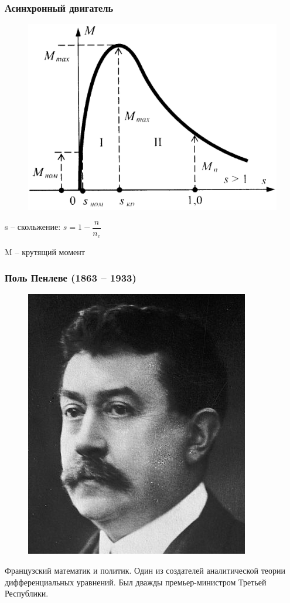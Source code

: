 \documentclass[hyperref={pdftex,unicode}]{beamer}
\begin{document}
\begin{frame}
\frametitle{Асинхронный двигатель}

\begin{figure}[H]
  \center
  \includegraphics[width=0.6\linewidth]{zavisimost-1}
\end{figure}

\vspace{10pt}

\small{s -- скольжение: $ s = 1 - \dfrac{n}{n_c} $}	

\small{M -- крутящий момент}
	

\end{frame}




\begin{frame}
\frametitle{Поль Пенлеве (1863 -- 1933)}

\begin{figure}[H]
  \center
  \includegraphics[width=0.4\linewidth]{penleve}
\end{figure}

\vspace{10pt}
Французский математик и политик. Один из создателей аналитической теории дифференциальных уравнений. Был дважды премьер-министром Третьей Республики.
\end{frame}
\end{document}
